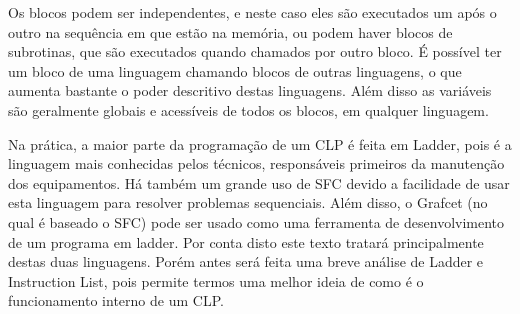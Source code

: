 Os blocos podem ser independentes, e neste caso eles são executados um após o outro na sequência em que estão na memória, ou podem haver blocos de subrotinas, que são executados quando chamados por outro bloco. É possível ter um bloco de uma linguagem chamando blocos de outras linguagens, o que aumenta bastante o poder descritivo destas linguagens. Além disso as variáveis são geralmente globais e acessíveis de todos os blocos, em qualquer linguagem.

Na prática, a maior parte da programação de um CLP é feita em Ladder, pois é a linguagem mais conhecidas pelos técnicos, responsáveis primeiros da manutenção dos equipamentos. Há também um grande uso de SFC devido a facilidade de usar esta linguagem para resolver problemas sequenciais. Além disso, o Grafcet (no qual é baseado o SFC) pode ser usado como uma ferramenta de desenvolvimento de um programa em ladder. Por conta disto este texto tratará principalmente destas duas linguagens. Porém antes será feita uma breve análise de Ladder e Instruction List, pois permite termos uma melhor ideia de como é o funcionamento interno de um CLP.
